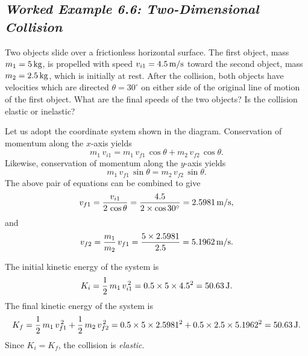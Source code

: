 \subsection*{\em Worked Example 6.6: Two-Dimensional Collision}
 Two objects slide over a frictionless
horizontal surface. The first object, mass $m_1=5\,{\rm kg}$, is propelled with
speed $v_{i1}  = 4.5\,{\rm m/s}$ toward the second object, mass
$m_2 =2.5\,{\rm kg}$, which is initially at rest. After the collision, both
objects have velocities which are directed $\theta=30^\circ$ on either side of the
original line of motion of the first object. What are the
final speeds of the two objects? Is the collision elastic or  inelastic?

\begin{figure*}[ht]
\epsfysize=2in
\centerline{}
\end{figure*}

 Let us adopt the coordinate system shown in the diagram. Conservation
of momentum along the $x$-axis yields
$$
m_1\,v_{i1}  = m_1\,v_{f1}\,\cos\theta + m_2\,v_{f2}\,\cos\theta.
$$
Likewise, conservation of momentum along the $y$-axis yields
$$
m_1\,v_{f1}\,\sin\theta = m_2\,v_{f2}\,\sin\theta.
$$
The above pair of equations can be combined to give
$$
v_{f1} = \frac{v_{i1}}{2\,\cos\theta} = \frac{4.5}{2\times\cos 30^\circ} = 2.5981\,{\rm m/s},
$$
and
$$
v_{f2} = \frac{m_1}{m_2}\,v_{f1} = \frac{5\times 2.5981}{2.5} = 5.1962\,{\rm m/s}.
$$

The initial kinetic energy of the system is
$$
K_i = \frac{1}{2}\,m_1\,v_{i1}^{\,2} = 0.5\times 5\times 4.5^2 = 50.63\,{\rm J}.
$$
The final kinetic energy of the system is
$$
K_f= \frac{1}{2}\,m_1\,v_{f1}^{\,2}+ \frac{1}{2}\,m_2\,v_{f2}^{\,2}=
0.5\times 5\times 2.5981^2 + 0.5\times 2.5\times 5.1962^2 = 50.63\,{\rm J}.
$$
Since $K_i=K_f$, the collision is {\em elastic}.
